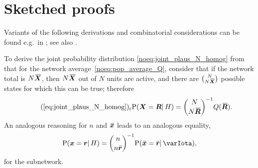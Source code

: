 \documentclass{article}
\theoremstyle{remark}
\theoremstyle{innote}
\newcommand*{\citep}{\parencites}
\renewcommand*{\|}{\mathpunct{|}}%
\newcommand*{\p}{\mathrm{P}}%
\newcommand*{\chap}{ch.}%
\newcommand*{\chaps}{chs}%
\newcommand*{\eg}{{e.g.}}
\newcommand*{\labelbis}[1]{\tag*{(\ref{#1})$_\text{r}$}}
\theoremstyle{simple}
\newcommand*{\widebar}[1]{{\mkern1.5mu\skew{2}\overline{\mkern-1.5mu#1\mkern-1.5mu}\mkern 1.5mu}}
\newcommand*{\av}{\widebar} %
\newcommand*{\sav}{\widebar} %
\newcommand*{\yxx}{x}%
\newcommand*{\yx}{\bm{\yxx}}%
\newcommand*{\yxs}{\sav{\yx}}%
\newcommand*{\yX}{\bm{X}}%
\newcommand*{\yXf}{\av{\yX}}%
\newcommand*{\yr}{\bm{r}}%
\newcommand*{\yrs}{\sav{\yr}}%
\newcommand*{\yR}{\bm{R}}%
\newcommand*{\yRf}{\av{\yR}}%
\newcommand*{\yH}{\varIota}
\begin{document}
  \section{Sketched proofs}
  \label{nosec:derivations}

  Variants of the following derivations and combinatorial considerations
  can be found \eg\ in
  \cites[\chaps~I--IV]{whitworth1867_r1965}[\chap~II]{feller1950_r1968}[\chap~3]{jaynes1994_r2003};
  see also \citep{whitworth1897}.

  To derive the joint probability distribution
  \eqref{noeq:joint_plaus_N_homog} from that for the network
  average~\eqref{noeq:pop_average_Q}, consider that if the network total
  is $N\yXf$, then $N\yXf$ out of $N$ units are active, and there are
  $\tbinom{N}{N\yXf}$ possible states for which this can be true; therefore
  \begin{equation}
    \labelbis{eq:joint_plaus_N_homog}
    \p(\yX = \yR \| H) = \binom{N}{N\yRf}^{-1}Q(\yRf).
  \end{equation}
An analogous reasoning for $n$ and $\yxs$ leads to an analogous equality,
\begin{equation}
  \label{noeq:aver_subpop}
  \p(\yx=\yr \| H) = \binom{n}{n\yrs}^{-1} \p(\yxs=\yrs\|\yH),
\end{equation}
for the subnetwork.

\bigskip 
\end{document}
